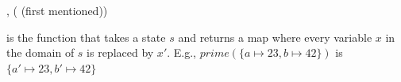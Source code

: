 \documentclass[landscape, a4paper]{article}
\begin{document}
\begin{minipage}[t]{0.2\linewidth}
\begin{betterlist}
\begin{betterlist}
			\item {}
			\item {},  ( (first mentioned))
		\end{betterlist}
		\item {}
		\begin{betterlist}
			\item \color{orange} is the function that takes a state $s$ and returns a map where every variable $x$ in the domain of $s$ is replaced by $x'$. E.g., $prime(\{a \mapsto 23, b \mapsto 42\})$ is $\{a' \mapsto 23, b' \mapsto 42\}$\color{black}
		\end{betterlist}


\end{betterlist}
\end{minipage}
\end{document}
